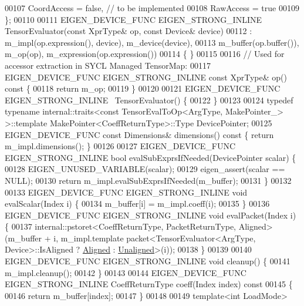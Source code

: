 \begin{DoxyCode}
00107     CoordAccess = \textcolor{keyword}{false},  \textcolor{comment}{// to be implemented}
00108     RawAccess = \textcolor{keyword}{true}
00109   \};
00110 
00111   EIGEN\_DEVICE\_FUNC EIGEN\_STRONG\_INLINE TensorEvaluator(\textcolor{keyword}{const} XprType& op, \textcolor{keyword}{const} Device& device)
00112       : m\_impl(op.expression(), device), m\_device(device),
00113           m\_buffer(op.buffer()), m\_op(op), m\_expression(op.expression())
00114   \{ \}
00115 
00116   \textcolor{comment}{// Used for accessor extraction in SYCL Managed TensorMap:}
00117   EIGEN\_DEVICE\_FUNC EIGEN\_STRONG\_INLINE \textcolor{keyword}{const} XprType& op()\textcolor{keyword}{ const }\{
00118     \textcolor{keywordflow}{return} m\_op;
00119   \}
00120   
00121   EIGEN\_DEVICE\_FUNC EIGEN\_STRONG\_INLINE ~TensorEvaluator() \{
00122   \}
00123 
00124   \textcolor{keyword}{typedef} \textcolor{keyword}{typename} internal::traits<const TensorEvalToOp<ArgType, MakePointer\_> >::template 
      MakePointer<CoeffReturnType>::Type DevicePointer;
00125   EIGEN\_DEVICE\_FUNC \textcolor{keyword}{const} Dimensions& dimensions()\textcolor{keyword}{ const }\{ \textcolor{keywordflow}{return} m\_impl.dimensions(); \}
00126 
00127   EIGEN\_DEVICE\_FUNC EIGEN\_STRONG\_INLINE \textcolor{keywordtype}{bool} evalSubExprsIfNeeded(DevicePointer scalar) \{
00128     EIGEN\_UNUSED\_VARIABLE(scalar);
00129     eigen\_assert(scalar == NULL);
00130     \textcolor{keywordflow}{return} m\_impl.evalSubExprsIfNeeded(m\_buffer);
00131   \}
00132 
00133   EIGEN\_DEVICE\_FUNC EIGEN\_STRONG\_INLINE \textcolor{keywordtype}{void} evalScalar(Index i) \{
00134     m\_buffer[i] = m\_impl.coeff(i);
00135   \}
00136   EIGEN\_DEVICE\_FUNC EIGEN\_STRONG\_INLINE \textcolor{keywordtype}{void} evalPacket(Index i) \{
00137     internal::pstoret<CoeffReturnType, PacketReturnType, Aligned>(m\_buffer + i, m\_impl.template 
      packet<TensorEvaluator<ArgType, Device>::IsAligned ? \hyperlink{group__enums_gga45fe06e29902b7a2773de05ba27b47a1ad37d4c71425bb286e9b4103830538fbf}{Aligned} : \hyperlink{group__enums_gga45fe06e29902b7a2773de05ba27b47a1ac935220b4c844108e183ebe30a4d5204}{Unaligned}>(i));
00138   \}
00139 
00140   EIGEN\_DEVICE\_FUNC EIGEN\_STRONG\_INLINE \textcolor{keywordtype}{void} cleanup() \{
00141     m\_impl.cleanup();
00142   \}
00143 
00144   EIGEN\_DEVICE\_FUNC EIGEN\_STRONG\_INLINE CoeffReturnType coeff(Index index)\textcolor{keyword}{ const}
00145 \textcolor{keyword}{  }\{
00146     \textcolor{keywordflow}{return} m\_buffer[index];
00147   \}
00148 
00149   \textcolor{keyword}{template}<\textcolor{keywordtype}{int} LoadMode>

\end{DoxyCode}
